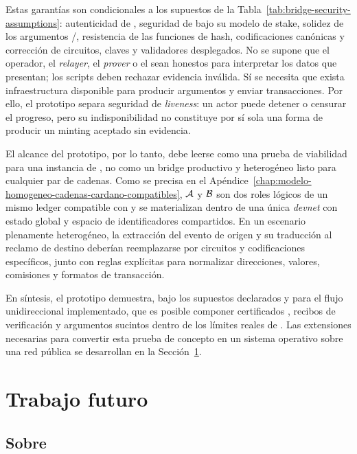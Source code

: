 Estas garantías son condicionales a los supuestos de la Tabla~\ref{tab:bridge-security-assumptions}: autenticidad de \GenesisVerificationKey, seguridad de \Mithril bajo su modelo de stake, solidez de los argumentos \HaloTwo/\Groth, resistencia de las funciones de hash, codificaciones canónicas y corrección de circuitos, claves y validadores desplegados. No se supone que el operador, el \textit{relayer}, el \textit{prover} o el \MithrilAggregator sean honestos para interpretar los datos que presentan; los scripts deben rechazar evidencia inválida. Sí se necesita que exista infraestructura disponible para producir argumentos y enviar transacciones. Por ello, el prototipo separa seguridad de \textit{liveness}: un actor \Offchain puede detener o censurar el progreso, pero su indisponibilidad no constituye por sí sola una forma de producir un minting aceptado sin evidencia.

El alcance del prototipo, por lo tanto, debe leerse como una prueba de viabilidad para una instancia de \Cardano, no como un bridge productivo y heterogéneo listo para cualquier par de cadenas. Como se precisa en el Apéndice~\ref{chap:modelo-homogeneo-cadenas-cardano-compatibles}, $\mathcal{A}$ y $\mathcal{B}$ son dos roles lógicos de un mismo ledger compatible con \Cardano y se materializan dentro de una única \textit{devnet} con estado global y espacio de identificadores compartidos. En un escenario plenamente heterogéneo, la extracción del evento de origen y su traducción al reclamo de destino deberían reemplazarse por circuitos y codificaciones específicos, junto con reglas explícitas para normalizar direcciones, valores, comisiones y formatos de transacción.

En síntesis, el prototipo demuestra, bajo los supuestos declarados y para el flujo unidireccional implementado, que es posible componer \Onchain certificados \Mithril, recibos de verificación y argumentos sucintos dentro de los límites reales de \Cardano. Las extensiones necesarias para convertir esta prueba de concepto en un sistema operativo sobre una red pública se desarrollan en la Sección~\ref{sec:conclusions-and-future-work-trabajo-futuro}.


\section{Trabajo futuro}
\label{sec:conclusions-and-future-work-trabajo-futuro}

\subsection{Sobre }
\label{subsec:conclusions-and-future-work-sobre-cip-133}

